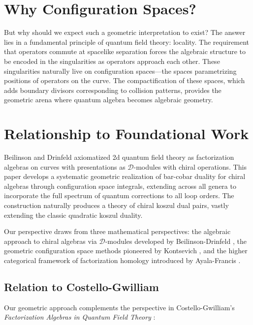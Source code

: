 \section{Why Configuration Spaces?}

But why should we expect such a geometric interpretation to exist? The answer lies in a fundamental principle of quantum field theory: locality. The requirement that operators commute at spacelike separation forces the algebraic structure to be encoded in the singularities as operators approach each other. These singularities naturally live on configuration spaces—the spaces parametrizing positions of operators on the curve. The compactification of these spaces, which adds boundary divisors corresponding to collision patterns, provides the geometric arena where quantum algebra becomes algebraic geometry.

\section{Relationship to Foundational Work}

Beilinson and Drinfeld \cite{BD04} axiomatized 2d quantum field theory as factorization algebras on curves with presentations as $\mathcal{D}$-modules with chiral operations. This paper develops a systematic geometric realization of bar-cobar duality for chiral algebras through configuration space integrals, extending across all genera to incorporate the full spectrum of quantum corrections to all loop orders. The construction naturally produces a theory of chiral koszul dual pairs, vastly extending the classic quadratic koszul duality.

Our perspective draws from three mathematical perspectives: the algebraic approach to chiral algebras via $\mathcal{D}$-modules developed by Beilinson-Drinfeld \cite{BD04}, the geometric configuration space methods pioneered by Kontsevich \cite{Kon94, Kon99}, and the higher categorical framework of factorization homology introduced by Ayala-Francis \cite{AF15}.

\subsection{Relation to Costello-Gwilliam}

Our geometric approach complements the perspective in Costello-Gwilliam's 
\textit{Factorization Algebras in Quantum Field Theory} \cite{CostelloGwilliam}:

